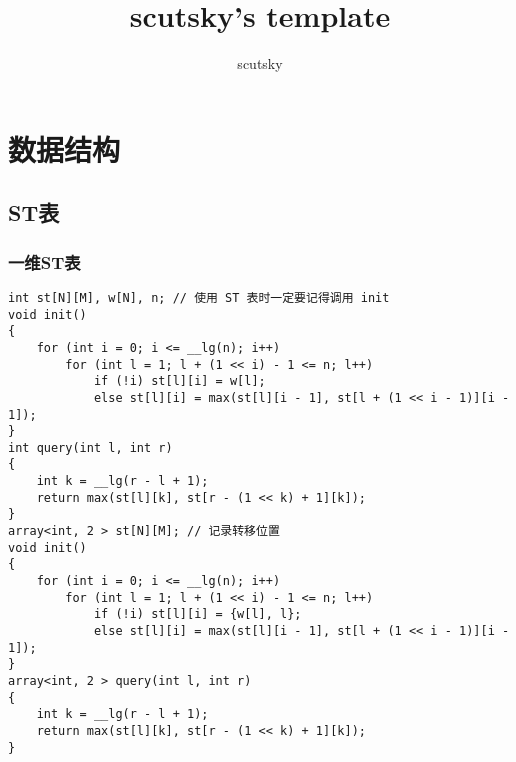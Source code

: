 \documentclass[a4paper, fontset=none]{ctexart}
\title{scutsky's template}
\author{scutsky}
\date{}
\begin{document}
\small
\begin{titlepage}
\maketitle
\end{titlepage}

\newpage
\pagestyle{empty}
\renewcommand{\contentsname}{目录}
\tableofcontents %
\newpage\clearpage
\newpage
\pagestyle{fancy}
\setcounter{page}{1}   %

\section{数据结构}
\subsection{ST表}
\subsubsection{一维ST表}
\begin{verbatim}
int st[N][M], w[N], n; // 使用 ST 表时一定要记得调用 init
void init()
{
    for (int i = 0; i <= __lg(n); i++)
        for (int l = 1; l + (1 << i) - 1 <= n; l++)
            if (!i) st[l][i] = w[l];
            else st[l][i] = max(st[l][i - 1], st[l + (1 << i - 1)][i - 1]);
}
int query(int l, int r)
{
    int k = __lg(r - l + 1);
    return max(st[l][k], st[r - (1 << k) + 1][k]);
}
array<int, 2 > st[N][M]; // 记录转移位置
void init()
{
    for (int i = 0; i <= __lg(n); i++)
        for (int l = 1; l + (1 << i) - 1 <= n; l++)
            if (!i) st[l][i] = {w[l], l};
            else st[l][i] = max(st[l][i - 1], st[l + (1 << i - 1)][i - 1]);
}
array<int, 2 > query(int l, int r)
{
    int k = __lg(r - l + 1);
    return max(st[l][k], st[r - (1 << k) + 1][k]);
}
\end{verbatim}
\end{document}
